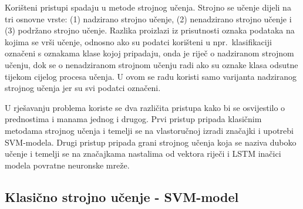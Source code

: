 \documentclass[times, utf8, zavrsni]{fer}
\begin{document}
Korišteni pristupi spadaju u metode strojnog učenja. Strojno se učenje dijeli na tri osnovne vrste: (1) nadzirano strojno učenje, (2) nenadzirano strojno učenje i (3) podržano strojno učenje. Razlika proizlazi iz prisutnosti oznaka podataka na kojima se vrši učenje, odnosno ako su podatci korišteni u npr.~klasifikaciji označeni s oznakama klase kojoj pripadaju, onda je riječ o nadziranom strojnom učenju, dok se o nenadziranom strojnom učenju radi ako su oznake klasa odsutne tijekom cijelog procesa učenja. U ovom se radu koristi samo varijanta nadziranog strojnog učenja jer su svi podatci označeni.

U rješavanju problema koriste se dva različita pristupa kako bi se osvijestilo o prednostima i manama jednog i drugog. Prvi pristup pripada klasičnim metodama strojnog učenja i temelji se na vlastoručnoj izradi značajki i upotrebi \gls{SVM}-modela. Drugi pristup pripada grani strojnog učenja koja se naziva duboko učenje i  temelji se na značajkama nastalima od vektora riječi  i \gls{LSTM} inačici modela povratne neuronske mreže.



\subsection{Klasično strojno učenje - \gls{SVM}-model}
\end{document}
